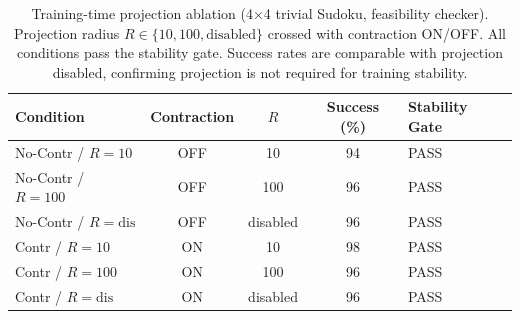 \begin{table}[t]
\caption{Training-time projection ablation (4$\times$4 trivial Sudoku, feasibility checker). 
Projection radius $R\in\{10, 100, \text{disabled}\}$ crossed with contraction ON/OFF.
All conditions pass the stability gate. 
Success rates are comparable with projection disabled, confirming projection is not required for training stability.}
\label{tab:exp3_projection_ablation}
\centering
\small
\begin{tabular}{@{}lcccl@{}}
\toprule
Condition & Contraction & $R$ & Success (\%) & Stability Gate \\
\midrule
No-Contr / $R{=}10$ & OFF & 10 & 94 & PASS \\
No-Contr / $R{=}100$ & OFF & 100 & 96 & PASS \\
No-Contr / $R{=}\text{dis}$ & OFF & disabled & 96 & PASS \\
Contr / $R{=}10$ & ON & 10 & 98 & PASS \\
Contr / $R{=}100$ & ON & 100 & 96 & PASS \\
Contr / $R{=}\text{dis}$ & ON & disabled & 96 & PASS \\
\bottomrule
\end{tabular}
\end{table}

